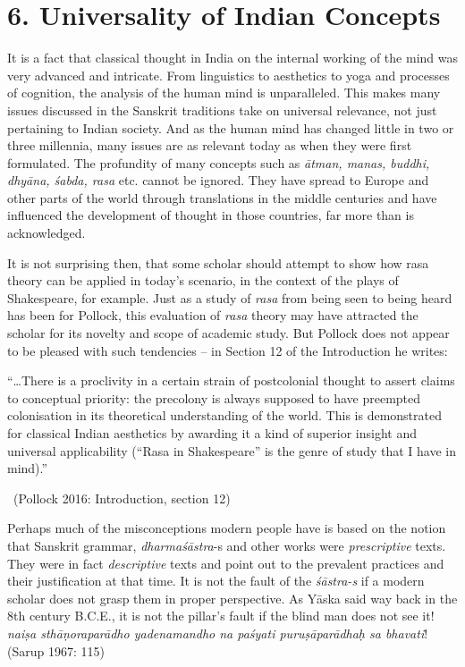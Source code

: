 \section*{6. Universality of Indian Concepts}

It is a fact that classical thought in India on the internal working of the mind was very advanced and intricate. From linguistics to aesthetics to yoga and processes of cognition, the analysis of the human mind is unparalleled. This makes many issues discussed in the Sanskrit traditions take on universal relevance, not just pertaining to Indian society. And as the human mind has changed little in two or three millennia, many issues are as relevant today as when they were first formulated. The profundity of many concepts such as \textit{ātman, manas, buddhi, dhyāna, śabda, rasa} etc. cannot be ignored. They have spread to Europe and other parts of the world through translations in the middle centuries and have influenced the development of thought in those countries, far more than is acknowledged.

It is not surprising then, that some scholar should attempt to show how rasa theory can be applied in today’s scenario, in the context of the plays of Shakespeare, for example. Just as a study of \textit{rasa} from being seen to being heard has been for Pollock, this evaluation of \textit{rasa} theory may have attracted the scholar for its novelty and scope of academic study. But Pollock does not appear to be pleased with such tendencies – in Section 12 of the Introduction he writes:

\begin{myquote}
“…There is a proclivity in a certain strain of postcolonial thought to assert claims to conceptual priority: the precolony is always supposed to have preempted colonisation in its theoretical understanding of the world. This is demonstrated for classical Indian aesthetics by awarding it a kind of superior insight and universal applicability (“Rasa in Shakespeare” is the genre of study that I have in mind).” 

~\hfill (Pollock 2016: Introduction, section 12)
\end{myquote}

Perhaps much of the misconceptions modern people have is based on the notion that Sanskrit grammar, \textit{dharmaśāstra}-s and other works were \textit{prescriptive} texts. They were in fact \textit{descriptive} texts and point out to the prevalent practices and their justification at that time. It is not the fault of the \textit{śāstra-s} if a modern scholar does not grasp them in proper perspective. As Yāska said way back in the 8th century B.C.E., it is not the pillar’s fault if the blind man does not see it! \textit{naiṣa sthāṇoraparādho yadenamandho na paśyati  puruṣāparādhaḥ sa bhavati}! (Sarup 1967: 115)


